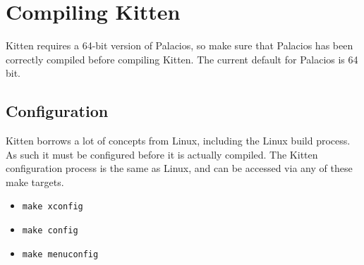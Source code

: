\documentclass[11pt]{article}
\begin{document}
\section{Compiling Kitten}
Kitten requires a 64-bit version of Palacios, so make sure that
Palacios has been correctly compiled before compiling Kitten.  The
current default for Palacios is 64 bit. 

\subsection{Configuration}
Kitten borrows a lot of concepts from Linux, including the Linux build
process. As such it must be configured before it is actually compiled.
The Kitten configuration process is the same as Linux, and can be
accessed via any of these make targets.
\begin{itemize}
\item \verb.make xconfig.
\item \verb.make config.
\item \verb.make menuconfig.
\end{itemize}
\end{document}
